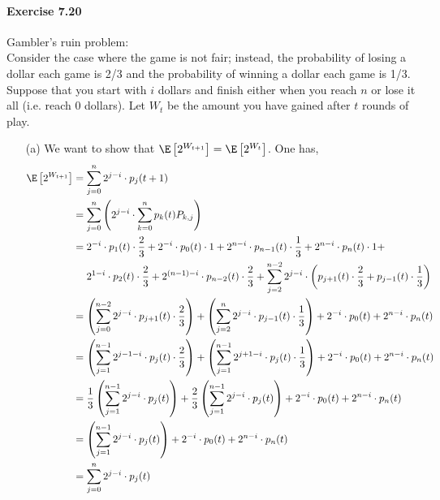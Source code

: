 \paragraph{Exercise 7.20} Gambler’s ruin problem: \\
Consider the case where the game is not fair; instead, the probability of losing
a dollar each game is 2/3 and the probability of winning a dollar each game is
1/3. Suppose that you start with $i$ dollars and finish either when you reach $n$
or lose it all (i.e. reach 0 dollars). Let $W_t$ be the amount you have gained
after $t$ rounds of play.
\begin{enumerate}
  \item[(a)] We want to show that $\E\left[2^{W_{t+1}}\right] = \E\left[2^{W_t}\right]$.
  One has,
  \begin{align*}
    \E\left[ 2^{W_{t+1}}\right]
      &= \sum_{j=0}^{n} 2^{j-i} \cdot p_j(t+1) \\
      &= \sum_{j=0}^{n} \left( 2^{j-i} \cdot \sum_{k=0}^{n} p_k(t)P_{k,j} \right) \\
      &= 2^{-i} \cdot p_1(t) \cdot \frac{2}{3} + 2^{-i} \cdot p_0(t) \cdot 1 +
         2^{n-i} \cdot p_{n-1}(t) \cdot \frac{1}{3} + 2^{n-i} \cdot p_n(t) \cdot 1 + \\
         &\quad\  2^{1-i} \cdot p_2(t) \cdot \frac{2}{3} +
         2^{(n-1)-i} \cdot p_{n-2}(t) \cdot \frac{2}{3} +
         \sum_{j=2}^{n-2} 2^{j-i} \cdot \left( p_{j+1}(t) \cdot \frac{2}{3} + p_{j-1}(t) \cdot \frac{1}{3} \right) \\
      &= \left( \sum_{j=0}^{n-2} 2^{j-i} \cdot p_{j+1}(t) \cdot \frac{2}{3} \right) +
         \left( \sum_{j=2}^{n} 2^{j-i} \cdot p_{j-1}(t) \cdot \frac{1}{3} \right) +
         2^{-i} \cdot p_0(t) + 2^{n-i} \cdot p_n(t) \\
      &= \left( \sum_{j=1}^{n-1} 2^{j-1-i} \cdot p_{j}(t) \cdot \frac{2}{3} \right) +
         \left( \sum_{j=1}^{n-1} 2^{j+1-i} \cdot p_{j}(t) \cdot \frac{1}{3} \right) +
         2^{-i} \cdot p_0(t) + 2^{n-i} \cdot p_n(t) \\
      &= \frac{1}{3} \left( \sum_{j=1}^{n-1} 2^{j-i} \cdot p_{j}(t) \right) +
         \frac{2}{3} \left( \sum_{j=1}^{n-1} 2^{j-i} \cdot p_{j}(t) \right) +
         2^{-i} \cdot p_0(t) + 2^{n-i} \cdot p_n(t) \\
      &= \left( \sum_{j=1}^{n-1} 2^{j-i} \cdot p_{j}(t) \right) +
         2^{-i} \cdot p_0(t) + 2^{n-i} \cdot p_n(t) \\
      &= \sum_{j=0}^{n} 2^{j-i} \cdot p_{j}(t) \\

\end{align*}
\end{enumerate}
